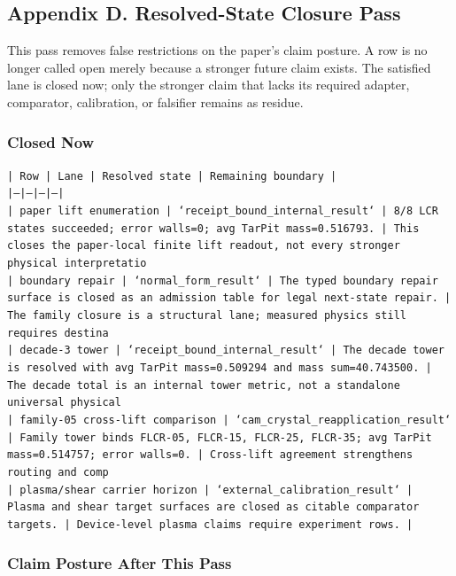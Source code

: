 \documentclass[11pt]{article}
\begin{document}
\subsection*{Appendix D. Resolved-State Closure Pass}

This pass removes false restrictions on the paper's claim posture. A row is no longer called open merely because a stronger future claim exists. The satisfied lane is closed now; only the stronger claim that lacks its required adapter, comparator, calibration, or falsifier remains as residue.

\subsubsection*{Closed Now}

\noindent\texttt{| Row | Lane | Resolved state | Remaining boundary |}\\
\noindent\texttt{|---|---|---|---|}\\
\noindent\texttt{| paper lift enumeration | `receipt\_bound\_internal\_result` | 8/8 LCR states succeeded; error walls=0; avg TarPit mass=0.516793. | This closes the paper-local finite lift readout, not every stronger physical interpretatio}\\
\noindent\texttt{| boundary repair | `normal\_form\_result` | The typed boundary repair surface is closed as an admission table for legal next-state repair. | The family closure is a structural lane; measured physics still requires destina}\\
\noindent\texttt{| decade-3 tower | `receipt\_bound\_internal\_result` | The decade tower is resolved with avg TarPit mass=0.509294 and mass sum=40.743500. | The decade total is an internal tower metric, not a standalone universal physical }\\
\noindent\texttt{| family-05 cross-lift comparison | `cam\_crystal\_reapplication\_result` | Family tower binds FLCR-05, FLCR-15, FLCR-25, FLCR-35; avg TarPit mass=0.514757; error walls=0. | Cross-lift agreement strengthens routing and comp}\\
\noindent\texttt{| plasma/shear carrier horizon | `external\_calibration\_result` | Plasma and shear target surfaces are closed as citable comparator targets. | Device-level plasma claims require experiment rows. |}\\

\subsubsection*{Claim Posture After This Pass}
\end{document}
